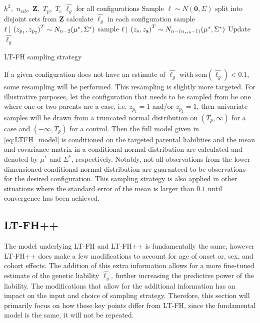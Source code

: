 \begin{algorithm}[h] 
\begin{algorithmic}[1] 
\INPUT $ h^2,$  $n_{sib},$  $\mathbf{Z},$  $T_p,$  $T_c$ 
\OUTPUT $ \hat{\ell_g} $ for all configurations
\STATE Sample $ \ell \sim N(\mathbf{0}, \Sigma) $ 
\STATE split into disjoint sets from $ \mathbf{Z} $
\STATE calculate $ \hat{\ell_g} $ in each configuration 
		\STATE sample  $ \ell \:\vert\: \left(z_{p_1}, z_{p_2} \right)^T \sim N_{n-2}(\mu^{\ast}, \Sigma^{\ast}) $
		\STATE sample $ \ell \:\vert\: \left(z_{o}, z_{\mathbf{s}} \right)^T \sim N_{n-(n_{sib} - 1)}(\mu^{\ast}, \Sigma^{\ast}) $
	\ENDIF	
	\STATE Update $ \hat{\ell_g} $
\ENDWHILE
\end{algorithmic}
\caption{LT-FH sampling strategy}
\label{alg:LTFH}
\end{algorithm}
If a given configuration does not have an estimate of $ \hat{\ell_g} $ with sem$(\hat{\ell_g}) < 0.1 $, some resampling will be performed. This resampling is slightly more targeted. For illustrative purposes, let the configuration that needs to be sampled from be one where one or two parents are a case, i.e. $ z_{p_1}  = 1$ and/or $ z_{p_2} = 1$, then univariate samples will be drawn from a truncated normal distribution on $ (T_p, \infty) $ for a case and $ (-\infty, T_p) $ for a control. Then the full model given in \cref{eq:LTFH_model} is conditioned on the targeted parental liabilities and the mean and covariance matrix in a conditional normal distribution are calculated and denoted by $ \mu^{\ast} $ and $ \Sigma^{\ast} $, respectively. Notably, not all observations from the lower dimensioned conditional normal distribution are guaranteed to be observations for the desired configuration. This sampling strategy is also applied in other situations where the standard error of the mean is larger than $ 0.1 $ until convergence has been achieved.


\subsection{LT-FH++}

The model underlying LT-FH and LT-FH++ is fundamentally the same, however LT-FH++ does make a few modifications to account for age of onset or, sex, and cohort effects. The addition of this extra information allows for a more fine-tuned estimate of the genetic liability $ \hat{\ell_g} $, further increasing the predictive power of the liability. The modifications that allow for the additional information has an impact on the input and choice of sampling strategy. Therefore, this section will primarily focus on how these key points differ from LT-FH, since the fundamental model is the same, it will not be repeated. 

